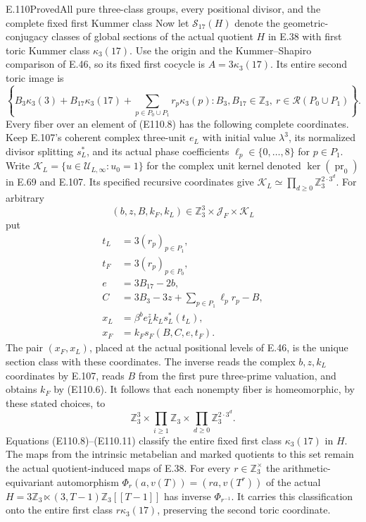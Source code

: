\begin{statement}{E.110}{Proved}{All pure three-class groups, every positional divisor, and the complete fixed first Kummer class}
Now let $\mathscr S_{17}(H)$ denote the geometric-conjugacy classes
of global sections of the actual quotient $H$ in E.38 with first
toric Kummer class $\kappa_3(17)$. Use the origin and the
Kummer--Shapiro comparison of E.46, so its fixed first cocycle is
$A=3\kappa_3(17)$. Its entire second toric image is
\[
 \left\{
   B_3\kappa_3(3)+B_{17}\kappa_3(17)
       +\sum_{p\in P_0\cup P_1}r_p\kappa_3(p):
   B_3,B_{17}\in\mathbb Z_3,\ 
   r\in\mathcal R(P_0\cup P_1)
 \right\}.
 \tag{E110.8}
\]
Every fiber over an element of (E110.8) has the following complete
coordinates. Keep E.107's coherent complex three-unit
$e_L$ with initial value $\lambda^3$, its normalized divisor
splitting $s_L^*$, and its actual phase coefficients
$\ell_p\in\{0,\ldots,8\}$ for $p\in P_1$.
Write $\mathcal K_L=\{u\in\mathcal U_{L,\infty}:u_0=1\}$
for the complex unit kernel denoted
$\ker(\operatorname{pr}_0)$ in E.69 and E.107.
Its specified recursive coordinates give
$\mathcal K_L\simeq\prod_{d\ge0}\mathbb Z_3^{2\cdot3^d}$.
For arbitrary
\[
 (b,z,B,k_F,k_L)\in
     \mathbb Z_3^3\times\mathcal J_F\times\mathcal K_L
 \tag{E110.9}
\]
put
\[
 \begin{aligned}
 t_L&=3(r_p)_{p\in P_1},\\
 t_F&=3(r_p)_{p\in P_0},\\
 e&=3B_{17}-2b,\\
 C&=3B_3-3z+\sum_{p\in P_1}\ell_p r_p-B,\\
 x_L&=\beta^b e_L^z k_L s_L^*(t_L),\\
 x_F&=k_F s_F(B,C,e,t_F).
 \end{aligned}
 \tag{E110.10}
\]
The pair $(x_F,x_L)$, placed at the actual positional levels of
E.46, is the unique section class with these coordinates.
The inverse reads the complex $b,z,k_L$ coordinates by E.107,
reads $B$ from the first pure three-prime valuation, and obtains
$k_F$ by (E110.6). It follows that each nonempty fiber is
homeomorphic, by these stated choices, to
\[
          \mathbb Z_3^3
               \times\prod_{i\ge1}\mathbb Z_3
               \times\prod_{d\ge0}\mathbb Z_3^{2\cdot3^d}.
 \tag{E110.11}
\]
Equations (E110.8)--(E110.11) classify the entire fixed first
class $\kappa_3(17)$ in $H$. The maps from the intrinsic
metabelian and marked quotients to this set remain the actual
quotient-induced maps of E.38.
For every $r\in\mathbb Z_3^\times$ the arithmetic-equivariant
automorphism
$\Phi_r(a,v(T))=(ra,v(T^r))$ of the actual
$H=3\mathbb Z_3\ltimes(3,T-1)\mathbb Z_3[[T-1]]$
has inverse $\Phi_{r^{-1}}$.
It carries this classification onto the entire first class
$r\kappa_3(17)$, preserving the second toric coordinate.


\end{statement}
